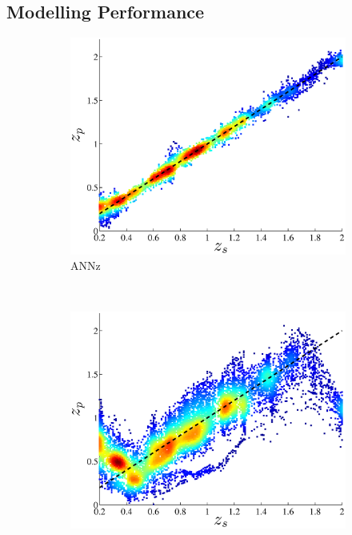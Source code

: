\documentclass[useAMS,usenatbib,fleqn]{mn2e}
\begin{document}
\subsection{Modelling Performance}

\begin{figure}
        \centering
        \begin{subfigure}[b]{0.3\textwidth}
                \includegraphics[width=\textwidth]{figures/ANN.eps}
                \caption{ANNz}
        \end{subfigure}
        ~
        \begin{subfigure}[b]{0.3\textwidth}
                \includegraphics[width=\textwidth]{figures/stableGP.eps}

\end{subfigure}
\end{figure}
\end{document}
